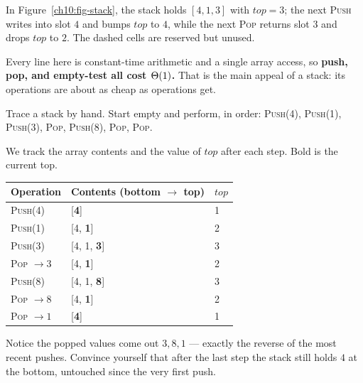 In Figure~\ref{ch10:fig-stack}, the stack holds $[4,1,3]$ with $top=3$; the next \textsc{Push} writes into slot $4$ and bumps $top$ to $4$, while the next \textsc{Pop} returns slot $3$ and drops $top$ to $2$. The dashed cells are reserved but unused.

\begin{algorithm}[H]
\caption{Stack operations on an array}
\DontPrintSemicolon
{}
\BlankLine
{}
\BlankLine
{}
\end{algorithm}

Every line here is constant-time arithmetic and a single array access, so \textbf{push, pop, and empty-test all cost $\Theta(1)$.} That is the main appeal of a stack: its operations are about as cheap as operations get.

\begin{labbox}
Trace a stack by hand. Start empty and perform, in order: \textsc{Push}(4), \textsc{Push}(1), \textsc{Push}(3), \textsc{Pop}, \textsc{Push}(8), \textsc{Pop}, \textsc{Pop}.

We track the array contents and the value of $top$ after each step. Bold is the current top.
\begin{center}
\begin{tabular}{lll}
\toprule
Operation & Contents (bottom $\to$ top) & $top$ \\
\midrule
\textsc{Push}(4) & [\textbf{4}] & 1 \\
\textsc{Push}(1) & [4, \textbf{1}] & 2 \\
\textsc{Push}(3) & [4, 1, \textbf{3}] & 3 \\
\textsc{Pop} $\to 3$ & [4, \textbf{1}] & 2 \\
\textsc{Push}(8) & [4, 1, \textbf{8}] & 3 \\
\textsc{Pop} $\to 8$ & [4, \textbf{1}] & 2 \\
\textsc{Pop} $\to 1$ & [\textbf{4}] & 1 \\
\bottomrule
\end{tabular}
\end{center}
Notice the popped values come out $3, 8, 1$ --- exactly the reverse of the most recent pushes. Convince yourself that after the last step the stack still holds $4$ at the bottom, untouched since the very first push.
\end{labbox}

